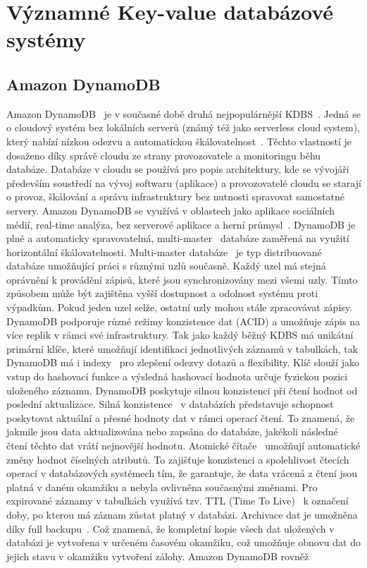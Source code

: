 \documentclass[czech,master,dept460,male,csharp,cpdeclaration]{diploma}
\begin{document}
	\section{Významné Key-value databázové systémy}
	
	\subsection{Amazon DynamoDB}
	
	Amazon DynamoDB~\cite{dynamodb} je v současné době druhá nejpopulárnější KDBS~\cite{dynamodb-dbengines-rank2}. Jedná se o cloudový systém bez lokálních serverů (známý též jako serverless cloud system), který nabízí nízkou odezvu a automatickou škálovatelnost~\cite{dynamodb-autoscaling}. Těchto vlastností je dosaženo díky správě cloudu ze strany provozovatele a monitoringu běhu databáze. Databáze v cloudu se používá pro popis architektury, kde se vývojáři především soustředí na vývoj softwaru (aplikace) a provozovatelé cloudu se starají o provoz, škálování a správu infrastruktury bez nutnosti spravovat samostatné servery. Amazon DynamoDB se využívá v oblastech jako aplikace sociálních médií, real-time analýza, bez serverové aplikace a herní průmysl~\cite{amazon-usecases}. DynamoDB je plně a automaticky spravovatelná, multi-master~\cite{multicluster} databáze zaměřená na využití horizontální škálovatelnosti. Multi-master databáze~\cite{postgres-multimaster-replication} je typ distribuované databáze umožňující práci s různými uzlů současně. Každý uzel má stejná oprávnění k provádění zápisů, které jsou synchronizovány mezi všemi uzly. Tímto způsobem může být zajištěna vyšší dostupnost a odolnost systému proti výpadkům. Pokud jeden uzel selže, ostatní uzly mohou stále zpracovávat zápisy. DynamoDB podporuje různé režimy konzistence dat (ACID) a umožňuje zápis na více replik v rámci své infrastruktury. Tak jako každý běžný KDBS má unikátní primární klíče, které umožňují identifikaci jednotlivých záznamů v tabulkách, tak DynamoDB má i indexy~\cite{dynamodb-secondary-index} pro zlepšení odezvy dotazů a flexibility. Klíč slouží jako vstup do hashovací funkce a výsledná hashovací hodnota určuje fyzickou pozici uloženého záznamu. DynamoDB poskytuje silnou konzistenci při čtení hodnot od poslední aktualizace. Silná konzistence~\cite{strong-consistency} v databázích představuje schopnost poskytovat aktuální a přesné hodnoty dat v rámci operací čtení. To znamená, že jakmile jsou data aktualizována nebo zapsána do databáze, jakékoli následné čtení těchto dat vrátí nejnovější hodnotu. Atomické čítače~\cite{atomic-counter} umožňují automatické změny hodnot číselných atributů. To zajišťuje konzistenci a spolehlivost čtecích operací v databázových systémech tím, že garantuje, že data vrácená z čtení jsou platná v daném okamžiku a nebyla ovlivněna současnými změnami. Pro expirované záznamy v tabulkách využívá tzv. TTL (Time To Live)~\cite{ttl} k označení doby, po kterou má záznam zůstat platný v databázi. Archivace dat je umožněna díky full backupu~\cite{full-backup}. Což znamená, že kompletní kopie všech dat uložených v databázi je vytvořena v určeném časovém okamžiku, což umožňuje obnovu dat do jejich stavu v okamžiku vytvoření zálohy. Amazon DynamoDB rovněž 
\end{document}
